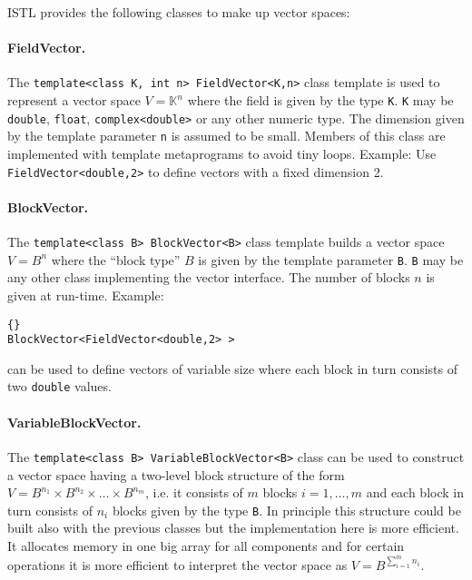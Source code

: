 \documentclass[11pt]{article}
\newcommand{\K}{\mathbb{K}}
\begin{document}
ISTL provides the following classes to make up vector spaces:

\paragraph{FieldVector.}

The \lstinline!template<class K, int n> FieldVector<K,n>! class
template is used to represent a vector space
$V=\K^n$ where the field is given by the type
\lstinline!K!.  \lstinline!K! may be \lstinline!double!, \lstinline!float!,
\lstinline!complex<double>! or any other numeric type.
The dimension given by the template parameter
\lstinline!n! is assumed to be small. Members of this class are
implemented with template metaprograms to avoid tiny loops.
Example: Use \lstinline!FieldVector<double,2>! to define vectors with
a fixed dimension 2.

\paragraph{BlockVector.}

The \lstinline!template<class B> BlockVector<B>! class template builds
a vector space $V=B^n$ where the ``block type'' $B$ is given by the
template parameter \lstinline!B!. \lstinline!B! may be any other class
implementing the vector interface. The number of blocks $n$ is given
at run-time. Example: 
\begin{lstlisting}{}
BlockVector<FieldVector<double,2> >
\end{lstlisting}
can be used to define vectors of variable size where each block in turn
consists of two \lstinline!double! values.

\paragraph{VariableBlockVector.}
\label{class:varblockvec}

The \lstinline!template<class B> VariableBlockVector<B>! class
can be used to construct a vector space having a two-level
block structure of the form
$V=B^{n_1}\times B^{n_2}\times\ldots \times B^{n_m}$, i.e. it consists
of $m$ blocks $i=1,\ldots,m$ and each block in turn consists of $n_i$ blocks
given by the type \lstinline!B!. In principle this structure could be
built also with the previous classes but the implementation here is
more efficient. It allocates memory in one big array for all
components and for certain operations it is more efficient to
interpret the vector space as $V=B^{\sum_{i=1}^{m} n_i}$.
\end{document}
